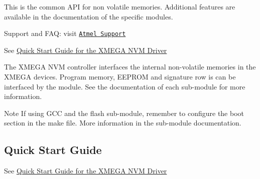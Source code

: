 This is the common A\-P\-I for non volatile memories. Additional features are available in the documentation of the specific modules.

Support and F\-A\-Q\-: visit \href{http://www.atmel.com/design-support/}{\tt Atmel Support}

See \hyperlink{xmega_nvm_quickstart}{Quick Start Guide for the X\-M\-E\-G\-A N\-V\-M Driver}

The X\-M\-E\-G\-A N\-V\-M controller interfaces the internal non-\/volatile memories in the X\-M\-E\-G\-A devices. Program memory, E\-E\-P\-R\-O\-M and signature row is can be interfaced by the module. See the documentation of each sub-\/module for more information.

\begin{DoxyNote}{Note}
If using G\-C\-C and the flash sub-\/module, remember to configure the boot section in the make file. More information in the sub-\/module documentation.
\end{DoxyNote}
\hypertarget{group__nvm__group_xmega_nvm_quickstart_section}{}\subsection{Quick Start Guide}\label{group__nvm__group_xmega_nvm_quickstart_section}
See \hyperlink{xmega_nvm_quickstart}{Quick Start Guide for the X\-M\-E\-G\-A N\-V\-M Driver} 